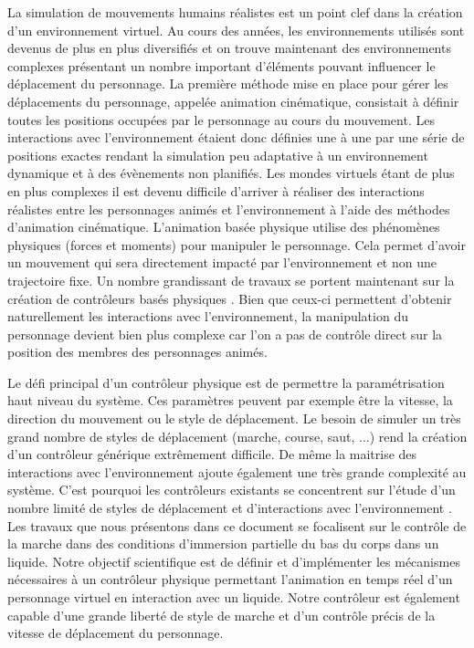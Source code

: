\documentclass[runningheads,a4paper]{llncs}
\begin{document}
La simulation de mouvements humains réalistes est un point clef dans la création d'un environnement virtuel. Au cours des années, les environnements utilisés sont devenus de plus en plus diversifiés et on trouve maintenant des environnements complexes présentant un nombre important d'éléments pouvant influencer le déplacement du personnage. La première méthode mise en place pour gérer les déplacements du personnage, appelée animation cinématique, consistait à définir toutes les positions occupées par le personnage au cours du mouvement. Les interactions avec l'environnement étaient donc définies une à une par une série de positions exactes rendant la simulation peu adaptative à un environnement dynamique et à des évènements non planifiés.  Les mondes virtuels étant de plus en plus complexes il est devenu difficile d'arriver à réaliser des interactions réalistes entre les personnages animés et l'environnement à l'aide des méthodes d'animation cinématique. L'animation basée physique utilise des phénomènes physiques (forces et moments) pour manipuler le personnage. Cela permet d'avoir un mouvement qui sera directement impacté par l'environnement et non une trajectoire fixe. Un nombre grandissant de travaux se portent maintenant sur la création de contrôleurs basés physiques \cite{geijtenbeek2012interactive}. Bien que ceux-ci permettent d'obtenir naturellement les interactions avec l'environnement, la manipulation du personnage devient bien plus complexe car l'on a pas de contrôle direct sur la position des membres des personnages animés.

Le défi principal d'un contrôleur physique est de permettre la paramétrisation haut niveau du système. Ces paramètres peuvent par exemple être la vitesse, la direction du mouvement ou le style de déplacement. Le besoin de simuler un très grand nombre de styles de déplacement (marche, course, saut, ...) rend la création d'un contrôleur générique extrêmement difficile. De même la maitrise des interactions avec l'environnement ajoute également une très grande complexité au système. C'est pourquoi les contrôleurs existants se concentrent sur l'étude d'un nombre limité de styles de déplacement et d'interactions avec l'environnement  \cite{geijtenbeek2012interactive}. Les travaux que nous présentons dans ce document se focalisent sur le contrôle de la marche dans des conditions d'immersion partielle du bas du corps dans un liquide. Notre objectif scientifique est de définir et d'implémenter les mécanismes nécessaires à un contrôleur physique permettant l'animation en temps réel d'un personnage virtuel en interaction avec un liquide. Notre contrôleur est également capable d'une grande liberté de style de marche et d'un contrôle précis de la vitesse de déplacement du personnage.
\end{document}
